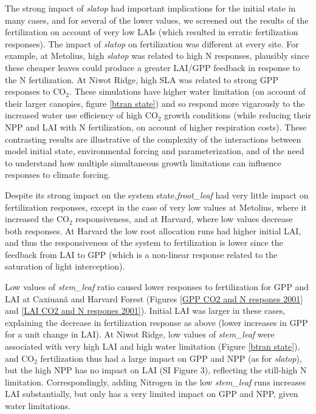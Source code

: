 \documentclass[draft,linenumbers]{agujournal}
\begin{document}
The strong impact of \emph{slatop} had important implications for the initial state in many cases, and for several of the lower values, we screened out the results of the fertilization on account of very low LAIs (which resulted in erratic fertilization responses). The impact of \emph{slatop} on fertilization was different at every site. For example, at Metolius, high  \emph{slatop} was related to high N responses, plausibly since these cheaper leaves could produce a greater LAI/GPP feedback in response to the N fertilization. At Niwot Ridge, high SLA was related to strong GPP responses to CO$_{2}$. These simulations have higher water limitation (on account of their larger canopies, figure \ref{btran state}) and so respond more vigarously to the increased water use efficiency of high CO$_{2}$ growth conditions (while reducing their NPP and LAI with N fertilization, on account of higher respiration costs). These contrasting results are illustrative of the complexity of the interactions between model initial state, environmental forcing and parameterization, and of the need to understand how multiple simultaneous growth limitations can influence responses to climate forcing.   

Despite its strong impact on the system state,\emph{froot\_leaf} had very little impact on fertilization responses, except in the case of very low values at Metolius, where it increased the CO$_{2}$ responsiveness, and at Harvard, where low values decrease both responses. At Harvard the low root allocation runs had higher initial LAI, and thus the responsiveness of the system to fertilization is lower since the feedback from LAI to GPP (which is a non-linear response related to the saturation of light interception). 

Low values of \emph{stem\_leaf} ratio caused lower responses to fertilization for GPP and LAI at Caxiuan\~a and Harvard Forest (Figures \ref{GPP CO2 and N respones 2001} and \ref{LAI CO2 and N respones 2001}). Initial LAI was larger in these cases, explaining the decrease in fertilization response as above (lower increases in GPP for a unit change in LAI).  At Niwot Ridge, low values of \emph{stem\_leaf} were associated with very high LAI and high water limitation (Figure \ref{btran state}), and CO$_{2}$ fertilization thus had a large impact on GPP and NPP (as for \emph{slatop}), but the high NPP has no impact on LAI (SI Figure 3), reflecting the still-high N limitation.  Correspondingly, adding Nitrogen in the low \emph{stem\_leaf} runs increases LAI substantially, but only has a very limited impact on GPP and NPP, given water limitations.
\end{document}
